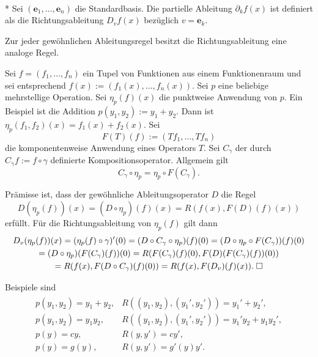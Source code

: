 \begin{Definition}\mbox{}\\*
Sei $(\mathbf e_1,\ldots,\mathbf e_n)$ die Standardbasis. 
Die partielle Ableitung $\partial_k f(x)$ ist definiert als
die Richtungsableitung $D_v f(x)$ bezüglich $v=\mathbf e_k$.
\end{Definition}

\begin{Korollar}
Zur jeder gewöhnlichen Ableitungsregel besitzt die
Richtungsableitung eine analoge Regel.
\end{Korollar}
Sei $f=(f_1,\ldots,f_n)$ ein Tupel von Funktionen aus einem
Funktionenraum und sei entsprechend
$f(x):=(f_1(x),\ldots, f_n(x))$. Sei $p$ eine beliebige mehrstellige
Operation. Sei $\eta_p(f)(x)$ die punktweise Anwendung von $p$.
Ein Beispiel ist die Addition $p(y_1,y_2):=y_1+y_2$. Dann ist
$\eta_p(f_1,f_2)(x)=f_1(x)+f_2(x)$. Sei%
\[F(T)(f) := (T f_1,\ldots ,T f_n)\]
die komponentenweise Anwendung eines Operators $T$.
Sei $C_\gamma$ der durch $C_\gamma f := f\circ\gamma$ definierte
Kompositionsoperator. Allgemein gilt%
\[C_\gamma\circ\eta_p = \eta_p\circ F(C_\gamma).\]

\begin{Beweis}
Prämisse ist, dass der gewöhnliche Ableitungsoperator $D$ die Regel
\[D(\eta_p(f))(x) = (D\circ\eta_p)(f)(x) = R(f(x),F(D)(f)(x))\]
erfüllt. Für die Richtungsableitung von $\eta_p(f)$ gilt dann
\begin{gather*}
D_v(\eta_p(f))(x) = (\eta_p(f)\circ\gamma)'(0)
= (D\circ C_\gamma\circ\eta_p)(f)(0)
= (D\circ\eta_p\circ F(C_\gamma))(f)(0)\\
= (D\circ\eta_p)(F(C_\gamma)(f))(0)
= R(F(C_\gamma)(f)(0),F(D)(F(C_\gamma)(f))(0))\\
= R(f(x),F(D\circ C_\gamma)(f)(0))
= R(f(x),F(D_v)(f)(x)).\;\square
\end{gather*}
\end{Beweis}

\noindent
Beispiele sind
\begin{gather*}
\begin{array}{ll}
p(y_1,y_2) = y_1+y_2, & R((y_1,y_2),(y_1',y_2')) = y_1'+y_2',\\[4pt]
p(y_1,y_2) = y_1 y_2, & R((y_1,y_2),(y_1',y_2')) = y_1'y_2 + y_1y_2',\\[4pt]
p(y) = cy, & R(y,y') = cy',\\[4pt]
p(y) = g(y), & R(y,y') = g'(y)y'.
\end{array}
\end{gather*}

